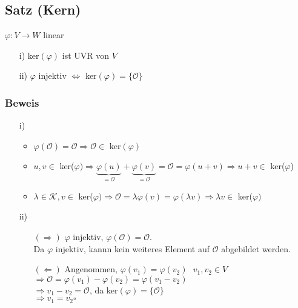 \documentclass[a4paper, 12pt,titlepage, pdf, headsepline]{article}
\newcommand{\K}{\mathcal{K}}
\newcommand{\qed}{\hfill$\square$}
\renewcommand{\>}{\rightarrow}
\renewcommand{\*}{\cdot}
\renewcommand{\O}{\mathcal{O}}
\renewcommand{\phi}{\varphi}
\begin{document}
		      			\subsection{Satz (Kern)}
		      			\label{6.9}
		      			$\phi: V \rightarrow W$ linear
		      			\begin{itemize}
		      				\item[i)] ker$(\phi)$ ist UVR von $V$
		      				\item[ii)] $\phi$ injektiv $\Leftrightarrow$ ker$(\phi) = \{\O\}$
		      			\end{itemize}
		      			\subsubsection*{Beweis}
		      			\begin{itemize}
		      				\item[i)]
		      				      \begin{itemize}
		      				      	\item $\phi(\O) = \mathcal{O} \Rightarrow \mathcal{O} \in$ ker$(\phi)$
		      				      	\item $u,v \in $ ker($\phi) \Rightarrow \underbrace{\phi(u)}_{= \O} + \underbrace{\phi(v)}_{=\O} = \O = \phi(u+v) \Rightarrow u+v \in $ ker($\phi$)
		      				      	\item $\lambda \in \K, v \in $ ker($\phi) \Rightarrow \O = \lambda \phi(v) = \phi(\lambda v) \Rightarrow \lambda v \in $ ker($\phi)$
		      				      \end{itemize}
		      				\item[ii)]
		      				      \begin{itemize}
		      				      	\item[$(\Rightarrow)$] $\phi$ injektiv, $\phi(\O) = \O$.\\ Da $\phi$ injektiv, kannn kein weiteres Element auf $\O$ abgebildet werden.
		      				      	\item[$(\Leftarrow)$] Angenommen, $\phi(v_1) = \phi(v_2)~~~ v_1, v_2 \in V$ \\
		      				      	      $\Rightarrow \O = \phi(v_1) - \phi(v_2) = \phi(v_1 - v_2)$ \\
		      				      	      $\Rightarrow v_1  - v_2 = \O$, da ker$(\phi) = \{\O\}$\\
		      				      	      $\Rightarrow v_1 = v_2 $\qed
		      				      \end{itemize}
		      			\end{itemize}
\end{document}
